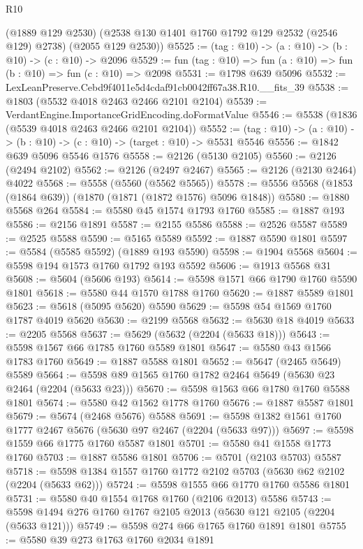 \begin{lexlean}{R10}
\begin{coremodule}
      (@1889 @129 @2530)
      (@2538 @130 @1401 @1760 @1792 @129 @2532 (@2546 @129) @2738)
      (@2055 @129 @2530))
@5525 := (tag : @10) -> (a : @10) -> (b : @10) -> (c : @10) -> @2096
@5529 := fun (tag : @10) => fun (a : @10) => fun (b : @10) => fun (c : @10) => @2098
@5531 := @1798 @639 @5096
@5532 := LexLeanPreserve.Cebd9f4011e5d4cdaf91cb0042ff67a38.R10.__fits_39
@5538 := @1803 (@5532 @4018 @2463 @2466 @2101 @2104)
@5539 := VerdantEngine.ImportanceGridEncoding.doFormatValue
@5546 := @5538 (@1836 (@5539 @4018 @2463 @2466 @2101 @2104))
@5552 := (tag : @10) -> (a : @10) -> (b : @10) -> (c : @10) -> (target : @10) -> @5531 @5546
@5556 := @1842 @639 @5096 @5546 @1576
@5558 := @2126 (@5130 @2105)
@5560 := @2126 (@2494 @2102)
@5562 := @2126 (@2497 @2467)
@5565 := @2126 (@2130 @2464) @4022
@5568 := @5558 (@5560 (@5562 @5565))
@5578 := @5556 @5568 (@1853 (@1864 @639)) (@1870 (@1871 (@1872 @1576) @5096 @1848))
@5580 := @1880 @5568 @264
@5584 := @5580 @45 @1574 @1793 @1760
@5585 := @1887 @193
@5586 := @2156 @1891
@5587 := @2155 @5586
@5588 := @2526 @5587
@5589 := @2525 @5588
@5590 := @5165 @5589
@5592 := @1887 @5590 @1801
@5597 := @5584 (@5585 @5592) (@1889 @193 @5590)
@5598 := @1904 @5568
@5604 := @5598 @194 @1573 @1760 @1792 @193 @5592
@5606 := @1913 @5568 @31
@5608 := @5604 (@5606 @193)
@5614 := @5598 @1571 @66 @1790 @1760 @5590 @1801
@5618 := @5580 @44 @1570 @1788 @1760
@5620 := @1887 @5589 @1801
@5623 := @5618 (@5095 @5620) @5590
@5629 := @5598 @54 @1569 @1760 @1787 @4019 @5620
@5630 := @2199 @5568
@5632 := @5630 @18 @4019
@5633 := @2205 @5568
@5637 := @5629 (@5632 (@2204 (@5633 @18)))
@5643 := @5598 @1567 @66 @1785 @1760 @5589 @1801
@5647 := @5580 @43 @1566 @1783 @1760
@5649 := @1887 @5588 @1801
@5652 := @5647 (@2465 @5649) @5589
@5664 := @5598 @89 @1565 @1760 @1782 @2464 @5649 (@5630 @23 @2464 (@2204 (@5633 @23)))
@5670 := @5598 @1563 @66 @1780 @1760 @5588 @1801
@5674 := @5580 @42 @1562 @1778 @1760
@5676 := @1887 @5587 @1801
@5679 := @5674 (@2468 @5676) @5588
@5691 := @5598 @1382 @1561 @1760 @1777 @2467 @5676 (@5630 @97 @2467 (@2204 (@5633 @97)))
@5697 := @5598 @1559 @66 @1775 @1760 @5587 @1801
@5701 := @5580 @41 @1558 @1773 @1760
@5703 := @1887 @5586 @1801
@5706 := @5701 (@2103 @5703) @5587
@5718 := @5598 @1384 @1557 @1760 @1772 @2102 @5703 (@5630 @62 @2102 (@2204 (@5633 @62)))
@5724 := @5598 @1555 @66 @1770 @1760 @5586 @1801
@5731 := @5580 @40 @1554 @1768 @1760 (@2106 @2013) @5586
@5743 := @5598 @1494 @276 @1760 @1767 @2105 @2013 (@5630 @121 @2105 (@2204 (@5633 @121)))
@5749 := @5598 @274 @66 @1765 @1760 @1891 @1801
@5755 := @5580 @39 @273 @1763 @1760 @2034 @1891

\end{coremodule}
\end{lexlean}
